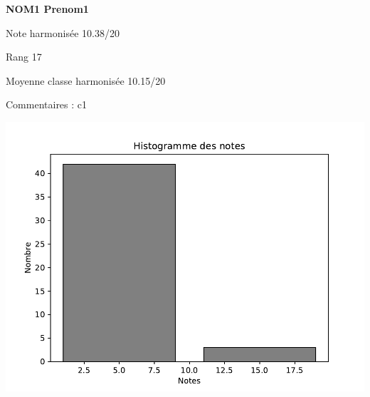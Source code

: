 \begin{minipage}[c]{.45\linewidth} 
\Large \textbf{\textsf{NOM1 Prenom1}} 
 
 \normalsize Note harmonisée 10.38/20 
 
Rang 17
 
Moyenne classe harmonisée 10.15/20 
 
Commentaires : 
c1 
\end{minipage}\hfill 
\begin{minipage}[c]{.45\linewidth}  
\begin{center}
\includegraphics[width=.8\linewidth]{../histo.pdf} 
\end{center}
\end{minipage}
\footnotesize 
